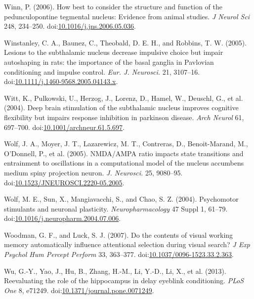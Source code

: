 \documentclass[
  11pt,
  a4paper,
]{scrbook}
\newlength{\cslhangindent}
\newenvironment{CSLReferences}[2] %
 {\begin{list}{}{%
  \setlength{\itemindent}{0pt}
  \setlength{\leftmargin}{0pt}
  \setlength{\parsep}{0pt}
  \ifodd #1
   \setlength{\leftmargin}{\cslhangindent}
   \setlength{\itemindent}{-1\cslhangindent}
  \fi
  \setlength{\itemsep}{#2\baselineskip}}}
 {\end{list}}
\begin{document}
\begin{CSLReferences}{1}{1}
Winn, P. (2006). How best to consider the structure and function of the
pedunculopontine tegmental nucleus: Evidence from animal studies.
\emph{J Neurol Sci} 248, 234--250.
doi:\href{https://doi.org/10.1016/j.jns.2006.05.036}{10.1016/j.jns.2006.05.036}.

Winstanley, C. A., Baunez, C., Theobald, D. E. H., and Robbins, T. W.
(2005). {Lesions to the subthalamic nucleus decrease impulsive choice
but impair autoshaping in rats: the importance of the basal ganglia in
Pavlovian conditioning and impulse control.} \emph{Eur. J. Neurosci.}
21, 3107--16.
doi:\href{https://doi.org/10.1111/j.1460-9568.2005.04143.x}{10.1111/j.1460-9568.2005.04143.x}.

Witt, K., Pulkowski, U., Herzog, J., Lorenz, D., Hamel, W., Deuschl, G.,
et al. (2004). Deep brain stimulation of the subthalamic nucleus
improves cognitive flexibility but impairs response inhibition in
parkinson disease. \emph{Arch Neurol} 61, 697--700.
doi:\href{https://doi.org/10.1001/archneur.61.5.697}{10.1001/archneur.61.5.697}.

Wolf, J. A., Moyer, J. T., Lazarewicz, M. T., Contreras, D.,
Benoit-Marand, M., O'Donnell, P., et al. (2005). {NMDA/AMPA ratio
impacts state transitions and entrainment to oscillations in a
computational model of the nucleus accumbens medium spiny projection
neuron.} \emph{J. Neurosci.} 25, 9080--95.
doi:\href{https://doi.org/10.1523/JNEUROSCI.2220-05.2005}{10.1523/JNEUROSCI.2220-05.2005}.

Wolf, M. E., Sun, X., Mangiavacchi, S., and Chao, S. Z. (2004).
{Psychomotor stimulants and neuronal plasticity.}
\emph{Neuropharmacology} 47 Suppl 1, 61--79.
doi:\href{https://doi.org/10.1016/j.neuropharm.2004.07.006}{10.1016/j.neuropharm.2004.07.006}.

Woodman, G. F., and Luck, S. J. (2007). Do the contents of visual
working memory automatically influence attentional selection during
visual search? \emph{J Exp Psychol Hum Percept Perform} 33, 363--377.
doi:\href{https://doi.org/10.1037/0096-1523.33.2.363}{10.1037/0096-1523.33.2.363}.

Wu, G.-Y., Yao, J., Hu, B., Zhang, H.-M., Li, Y.-D., Li, X., et al.
(2013). {Reevaluating the role of the hippocampus in delay eyeblink
conditioning.} \emph{PLoS One} 8, e71249.
doi:\href{https://doi.org/10.1371/journal.pone.0071249}{10.1371/journal.pone.0071249}.


\end{CSLReferences}
\end{document}

